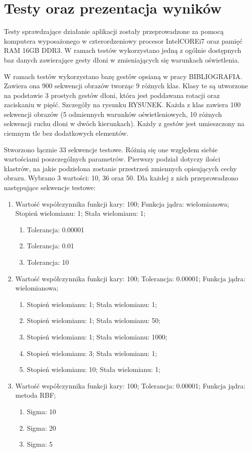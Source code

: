 \chapter{Testy oraz prezentacja wyników}
\label{cha: Tests}
Testy sprawdzające działanie aplikacji zostały przeprowadzone za pomocą komputera wyposażonego w czterordzeniowy procesor Intel\textregistered CORE\texttrademark i7 oraz pamięć RAM 16GB DDR3. W ramach testów wykorzystano jedną z ogólnie dostępnych baz danych zawierające gesty dłoni w zmieniających się warunkach oświetlenia.

W ramach testów wykorzystano bazę gestów opsianą w pracy BIBLIOGRAFIA. Zawiera ona 900 sekwencji obrazów tworząc 9 różnych klas. Klasy te są utworzone na podstawie 3 prostych gestów dłoni, która jest poddawana rotacji oraz zaciskaniu w pięść. Szczegóły na rysunku RYSUNEK. Każda z klas zawiera 100 sekwencji obrazów (5 odmiennych warunków oświetleniowych, 10 różnych sekwencji ruchu dłoni w dwóch kierunkach). Każdy z gestów jest umieszczony na ciemnym tle bez dodatkowych elementów.

Stworzono łącznie 33 sekwencje testowe. Różnią się one względem siebie wartościami poszczególnych parametrów. Pierwszy podział dotyczy ilości klastrów, na jakie podzielona zostanie przestrzeń zmiennych opisujących cechy obrazu. Wybrano 3 wartości: 10, 36 oraz 50. Dla każdej z nich przeprowadzono następujące sekwencje testowe: 
\begin{enumerate}
	\item Wartość współczynnika funkcji kary: 100; Funkcja jądra: wielomianowa; Stopień wielomianu: 1; Stała wielomianu: 1; 
	\begin{enumerate}
		\item Tolerancja: 0.00001
		\item Tolerancja: 0.01
		\item Tolerancja: 10
	\end{enumerate}
	\item Wartość współczynnika funkcji kary: 100; 
	Tolerancja: 0.00001; Funkcja jądra: wielomianowa;
	\begin{enumerate}
		\item Stopień wielomianu: 1; Stała wielomianu: 1;
		\item Stopień wielomianu: 1; Stała wielomianu: 50;
		\item Stopień wielomianu: 1; Stała wielomianu: 1000;
		\item Stopień wielomianu: 3; Stała wielomianu: 1;
		\item Stopień wielomianu: 10; Stała wielomianu: 1;
	\end{enumerate}
	\item Wartość współczynnika funkcji kary: 100; 
	Tolerancja: 0.00001; Funkcja jądra: metoda RBF;
	\begin{enumerate}
		\item Sigma: 10
		\item Sigma: 20
		\item Sigma: 5
	\end{enumerate}
\end{enumerate}

